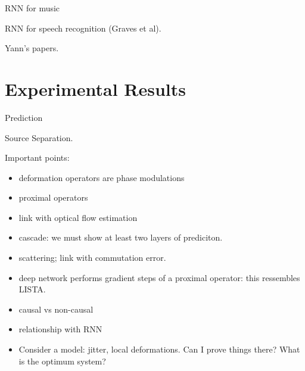 \documentclass[11pt]{article} %
\begin{document}
RNN for music

RNN for speech recognition (Graves et al). 

Yann's papers.

\section{Experimental Results}

Prediction

Source Separation.





Important points:

\begin{itemize}
\item deformation operators are phase modulations 
\item proximal operators
\item link with optical flow estimation
\item cascade: we must show at least two layers of prediciton.
\item scattering; link with commutation error.
\item deep network performs gradient steps of a proximal operator: this ressembles LISTA.
\item causal vs non-causal
\item relationship with RNN
\item Consider a model: jitter, local deformations. Can I prove things there? What is the optimum system?
\end{itemize}
\end{document}
